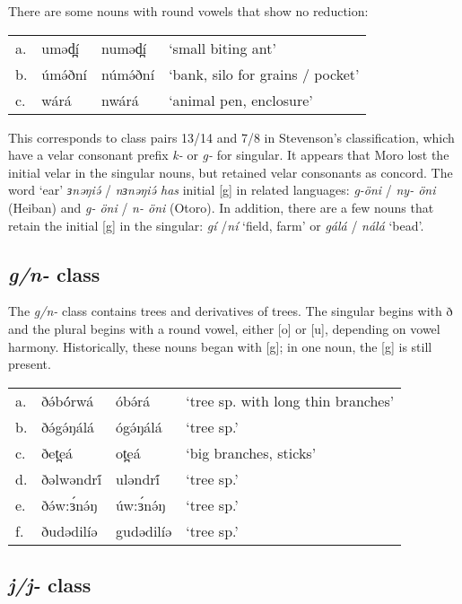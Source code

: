 There are some nouns with round vowels that show no reduction:

\ea
\begin{tabular}[t]{llll}
a.	&	uməd̪í	&	numəd̪í	&	‘small biting ant’\\
b.	&	úmə́ðní	&	númə́ðní	&	‘bank, silo for grains / pocket’\\
c.	&	wárá	&	nwárá	&	‘animal pen, enclosure’	\\
\end{tabular}
\z

This corresponds to class pairs 13/14 and 7/8 in Stevenson’s classification, which have a velar consonant prefix \textit{k-} or \textit{g-} for singular. It appears that Moro lost the initial velar in the singular nouns, but retained velar consonants as concord. The word ‘ear’ \textit{ɜnəŋiə́ }/ \textit{nɜnəŋiə́ has} initial [g] in related languages: \textit{g-öni} / \textit{ny- öni} (Heiban) and \textit{g- öni} / \textit{n- öni} (Otoro). In addition, there are a few nouns that retain the initial [g] in the singular: \textit{gí} /\textit{ní} ‘field, farm’ or \textit{gálá} / \textit{nálá} ‘bead’. 


\subsection{\textit{g/n-} class}

The \textit{g/n-} class contains trees and derivatives of trees. The singular begins with ð and the plural begins with a round vowel, either [o] or [u], depending on vowel harmony. Historically, these nouns began with [g]; in one noun, the [g] is still present. 

\ea
\begin{tabular}[t]{llll}
a.	&	ðə́bó́rwá		&	óbə́rá		&	‘tree sp. with long thin branches’\\
b.	&	ðə́gə́ŋálá		&	ógə́ŋálá	&	‘tree sp.’\\
c.	&	ðet̪eá		&	ot̪eá	&	‘big branches, sticks’\\
d.	&	ðəlwəndrí́	&	uləndrí́	&	‘tree sp.’\\
e.	&	ðə́w:ɜ́nə́ŋ		&	úw:ɜ́nə́ŋ	&	‘tree sp.’\\
f.	&	ðudədilíə	&	gudədilíə&	‘tree sp.’	\\
\end{tabular}
\z

\subsection{\textit{j/j-} class}

